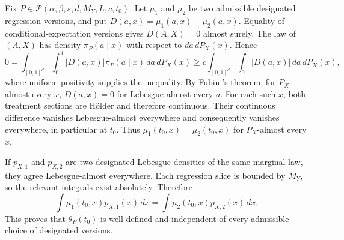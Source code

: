 Fix \(P\in\mathcal P(\alpha,\beta,s,d,M_Y,L,c,t_0)\). Let \(\mu_1\) and \(\mu_2\) be two admissible designated regression versions, and put \(D(a,x)=\mu_1(a,x)-\mu_2(a,x)\). Equality of conditional-expectation versions gives \(D(A,X)=0\) almost surely. The law of \((A,X)\) has density \(\pi_P(a\mid x)\) with respect to \(da\,dP_X(x)\). Hence
\[
0=\int_{[0,1]^d}\int_0^1\lvert D(a,x)\rvert\pi_P(a\mid x)\,da\,dP_X(x)
\ge c\int_{[0,1]^d}\int_0^1\lvert D(a,x)\rvert\,da\,dP_X(x),
\]
where uniform positivity supplies the inequality. By Fubini's theorem, for \(P_X\)-almost every \(x\), \(D(a,x)=0\) for Lebesgue-almost every \(a\). For each such \(x\), both treatment sections are Hölder and therefore continuous. Their continuous difference vanishes Lebesgue-almost everywhere and consequently vanishes everywhere, in particular at \(t_0\). Thus \(\mu_1(t_0,x)=\mu_2(t_0,x)\) for \(P_X\)-almost every \(x\).

If \(p_{X,1}\) and \(p_{X,2}\) are two designated Lebesgue densities of the same marginal law, they agree Lebesgue-almost everywhere. Each regression slice is bounded by \(M_Y\), so the relevant integrals exist absolutely. Therefore
\[
\int\mu_1(t_0,x)p_{X,1}(x)\,dx
=\int\mu_2(t_0,x)p_{X,2}(x)\,dx.
\]
This proves that \(\theta_P(t_0)\) is well defined and independent of every admissible choice of designated versions.
